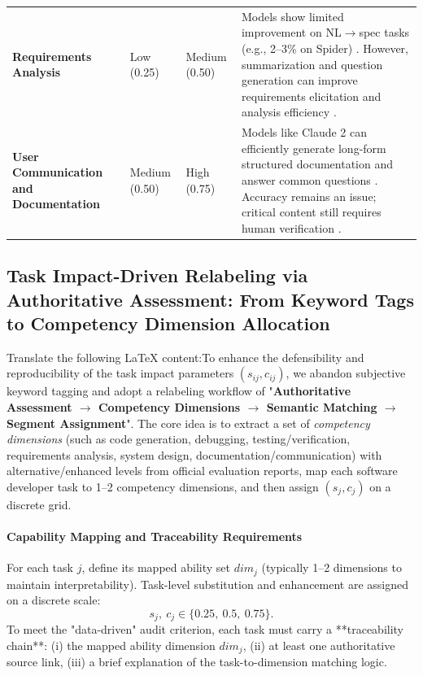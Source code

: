 \begin{table}[htbp]
\begin{tabular}{p{2.6cm} p{2.2cm} p{2.2cm} p{7.2cm}}
\textbf{Requirements Analysis} & Low (0.25) & Medium (0.50) &
Models show limited improvement on NL$\rightarrow$spec tasks (e.g., 2--3\% on Spider) \cite{chen2023selfdebugging}. \newline
However, summarization and question generation can improve requirements elicitation and analysis efficiency \cite{openai2023gpt4}. \\
\textbf{User Communication and Documentation} & Medium (0.50) & High (0.75) &
Models like Claude 2 can efficiently generate long-form structured documentation and answer common questions \cite{anthropic2023claude2}. \newline
Accuracy remains an issue; critical content still requires human verification \cite{openai2023gpt4}. \\
\bottomrule
\end{tabular}
\end{table}\subsection{Task Impact-Driven Relabeling via Authoritative Assessment: From Keyword Tags to Competency Dimension Allocation}Translate the following LaTeX content:To enhance the defensibility and reproducibility of the task impact parameters $(s_{ij}, c_{ij})$, we abandon subjective keyword tagging and adopt a relabeling workflow of "\textbf{Authoritative Assessment $\rightarrow$ Competency Dimensions $\rightarrow$ Semantic Matching $\rightarrow$ Segment Assignment}". The core idea is to extract a set of \emph{competency dimensions} (such as code generation, debugging, testing/verification, requirements analysis, system design, documentation/communication) with alternative/enhanced levels from official evaluation reports, map each software developer task to 1–2 competency dimensions, and then assign $(s_j, c_j)$ on a discrete grid.\paragraph{Capability Mapping and Traceability Requirements}For each task $j$, define its mapped ability set $\textit{dim}_j$ (typically 1--2 dimensions to maintain interpretability).  
Task-level substitution and enhancement are assigned on a discrete scale:  
\begin{equation}
s_j,\ c_j\in\{0.25,\ 0.5,\ 0.75\}.
\end{equation}  
To meet the "data-driven" audit criterion, each task must carry a **traceability chain**: (i) the mapped ability dimension $\textit{dim}_j$, (ii) at least one authoritative source link, (iii) a brief explanation of the task-to-dimension matching logic.  
